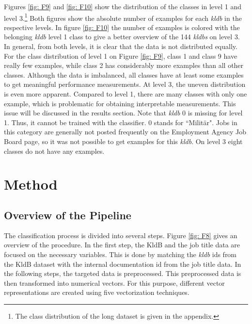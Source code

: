 \documentclass[12pt, a4paper, titlepage]{article}
\begin{document}
Figures \ref{fig: F9} and \ref{fig: F10} show the distribution of the classes in level 1 and level 3.\footnote{The class distribution of the long dataset is given in the appendix.} Both figures show the absolute number of examples for each \textit{kldb} in the respective levels. In figure \ref{fig: F10} the number of examples is colored with the belonging \textit{kldb} level 1 class to give a better overview of the 144 \textit{kldbs} on level 3. In general, from both levels, it is clear that the data is not distributed equally. For the class distribution of level 1 on Figure \ref{fig: F9}, class 1 and class 9 have really few examples, while class 2 has considerably more examples than all other classes. Although the data is imbalanced, all classes have at least some examples to get meaningful performance measurements. At level 3, the uneven distribution is even more apparent. Compared to level 1, there are many classes with only one example, which is problematic for obtaining interpretable measurements. This issue will be discussed in the results section. Note that \textit{kldb} 0 is missing for level 1. Thus, it cannot be trained with the classifier. 0 stands for ``Militär". Jobs in this category are generally not posted frequently on the Employment Agency Job Board page, so it was not possible to get examples for this \textit{kldb}. On level 3 eight classes do not have any examples.


\section{Method}
\subsection{Overview of the Pipeline}
The classification process is divided into several steps. Figure \ref{fig: F8} gives an overview of the procedure. In the first step, the \ac{KldB} and the job title data are focused on the necessary variables. This is done by matching the \textit{kldb} ids from the \ac{KldB} dataset with the internal documentation id from the job title data. In the following steps, the targeted data is preprocessed. This preprocessed data is then transformed into numerical vectors. For this purpose, different vector representations are created using five vectorization techniques.
\end{document}
